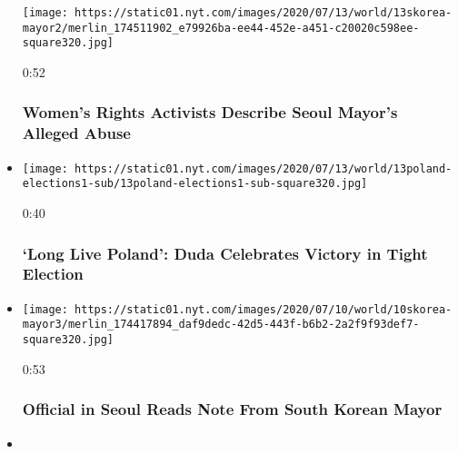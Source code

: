 \begin{itemize}
  \texttt{[image: https://static01.nyt.com/images/2020/07/13/world/13skorea-mayor2/merlin\_174511902\_e79926ba-ee44-452e-a451-c20020c598ee-square320.jpg]}

  0:52

  \hypertarget{womens-rights-activists-describe-seoul-mayors-alleged-abuse}{%
  \subsubsection{Women's Rights Activists Describe Seoul Mayor's Alleged
  Abuse}\label{womens-rights-activists-describe-seoul-mayors-alleged-abuse}}
\item
  \href{https://www.nytimes.com/video/world/europe/100000007236353/poland-election-duda-victory-speech.html?action=click\&module=video-series-bar\&region=header\&pgtype=Article\&playlistId=video/world}{}

  \texttt{[image: https://static01.nyt.com/images/2020/07/13/world/13poland-elections1-sub/13poland-elections1-sub-square320.jpg]}

  0:40

  \hypertarget{long-live-poland-duda-celebrates-victory-in-tight-election}{%
  \subsubsection{`Long Live Poland': Duda Celebrates Victory in Tight
  Election}\label{long-live-poland-duda-celebrates-victory-in-tight-election}}
\item
  \href{https://www.nytimes.com/video/us/100000007233462/seoul-officials-read-mayor-note.html?action=click\&module=video-series-bar\&region=header\&pgtype=Article\&playlistId=video/world}{}

  \texttt{[image: https://static01.nyt.com/images/2020/07/10/world/10skorea-mayor3/merlin\_174417894\_daf9dedc-42d5-443f-b6b2-2a2f9f93def7-square320.jpg]}

  0:53

  \hypertarget{official-in-seoul-reads-note-from-south-korean-mayor}{%
  \subsubsection{Official in Seoul Reads Note From South Korean
  Mayor}\label{official-in-seoul-reads-note-from-south-korean-mayor}}
\item
  \href{https://www.nytimes.com/video/us/100000007231708/melania-trump-statue-removed-after-being-set-on-fire.html?action=click\&module=video-series-bar\&region=header\&pgtype=Article\&playlistId=video/world}{}


\end{itemize}
